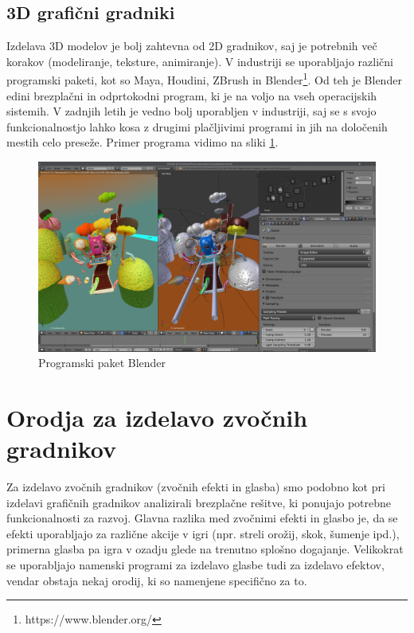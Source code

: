 \documentclass[12pt,a4paper,twoside]{book}
\begin{document}
\subsection{3D grafični gradniki}
Izdelava 3D modelov je bolj zahtevna od 2D gradnikov, saj je potrebnih več korakov (modeliranje, teksture, animiranje). V industriji se uporabljajo različni programski paketi, kot so Maya, Houdini, ZBrush in Blender\footnote{https://www.blender.org/}. Od teh je Blender edini brezplačni in odprtokodni program, ki je na voljo na vseh operacijskih sistemih. V zadnjih letih je vedno bolj uporabljen v industriji, saj se s svojo funkcionalnostjo lahko kosa z drugimi plačljivimi programi in jih na določenih mestih celo preseže. Primer programa vidimo na sliki \ref{slika:blenderDemo}.

\begin{figure}[h]
	\centering
	\includegraphics[width=13cm]{blenderDemo}
	\caption{Programski paket Blender}
	\label{slika:blenderDemo}
\end{figure}

\section{Orodja za izdelavo zvočnih gradnikov}
Za izdelavo zvočnih gradnikov (zvočnih efekti in glasba) smo podobno kot pri izdelavi grafičnih gradnikov analizirali brezplačne rešitve, ki ponujajo potrebne funkcionalnosti za razvoj. Glavna razlika med zvočnimi efekti in glasbo je, da se efekti uporabljajo za različne akcije v igri (npr. streli orožij, skok, šumenje ipd.), primerna glasba pa igra v ozadju glede na trenutno splošno dogajanje. Velikokrat se uporabljajo namenski programi za izdelavo glasbe tudi za izdelavo efektov, vendar obstaja nekaj orodij, ki so namenjene specifično za to.
\end{document}
